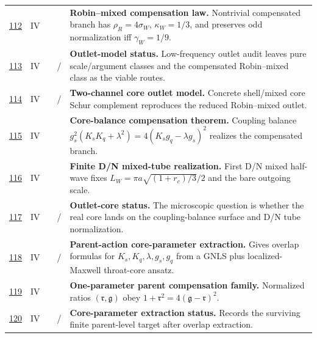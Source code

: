 {\begin{longtable}{@{}L{0.055\textwidth}L{0.075\textwidth}L{0.145\textwidth}L{0.235\textwidth}L{0.43\textwidth}@{}}
\addlinespace
\hyperref[stage:112]{112} & IV &  & \StatusExactClosure{} & \textbf{Robin--mixed compensation law.} Nontrivial compensated branch has \(\rho_R=4\sigma_W\), \(\kappa_W=1/3\), and preserves odd normalization iff \(\gamma_W=1/9\). \\
\addlinespace
\hyperref[stage:113]{113} & IV &  & \StatusExactClosure{} / \StatusOpen{} & \textbf{Outlet-model status.} Low-frequency outlet audit leaves pure scale/argument classes and the compensated Robin--mixed class as the viable routes. \\
\addlinespace
\hyperref[stage:114]{114} & IV &  & \StatusExactClosure{} / \StatusReduced{} & \textbf{Two-channel core outlet model.} Concrete shell/mixed core Schur complement reproduces the reduced Robin--mixed outlet. \\
\addlinespace
\hyperref[stage:115]{115} & IV &  & \StatusExactClosure{} & \textbf{Core-balance compensation theorem.} Coupling balance \(g_s^2(K_sK_q+\lambda^2)=4(K_sg_q-\lambda g_s)^2\) realizes the compensated branch. \\
\addlinespace
\hyperref[stage:116]{116} & IV &  & \StatusExactClosure{} & \textbf{Finite D/N mixed-tube realization.} First D/N mixed half-wave fixes \(L_W=\pi a\sqrt{(1+r_c)/3}/2\) and the bare outgoing scale. \\
\addlinespace
\hyperref[stage:117]{117} & IV &  & \StatusExactClosure{} / \StatusOpen{} & \textbf{Outlet-core status.} The microscopic question is whether the real core lands on the coupling-balance surface and D/N tube normalization. \\
\addlinespace
\hyperref[stage:118]{118} & IV &  & \StatusReduced{} / \StatusExactClosure{} & \textbf{Parent-action core-parameter extraction.} Gives overlap formulas for \(K_s,K_q,\lambda,g_s,g_q\) from a GNLS plus localized-Maxwell throat-core ansatz. \\
\addlinespace
\hyperref[stage:119]{119} & IV &  & \StatusExactClosure{} & \textbf{One-parameter parent compensation family.} Normalized ratios \((\mathfrak r,\mathfrak g)\) obey \(1+\mathfrak r^2=4(\mathfrak g-\mathfrak r)^2\). \\
\addlinespace
\hyperref[stage:120]{120} & IV &  & \StatusExactClosure{} / \StatusOpen{} & \textbf{Core-parameter extraction status.} Records the surviving finite parent-level target after overlap extraction. \\

\end{longtable}}
